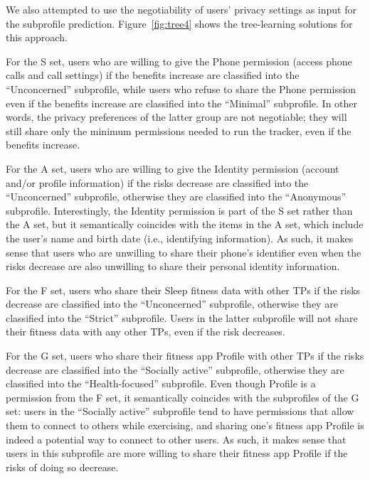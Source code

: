 We also attempted to use the negotiability of users' privacy settings as input for the subprofile prediction. Figure~\ref{fig:tree4} shows the tree-learning solutions for this approach.

%	


For the S set, users who are willing to give the Phone permission (access phone calls and call settings) if the benefits increase are classified into the ``Unconcerned'' subprofile, while users who refuse to share the Phone permission even if the benefits increase are classified into the ``Minimal'' subprofile. In other words, the privacy preferences of the latter group are not negotiable; they will still share only the minimum permissions needed to run the tracker, even if the benefits increase.

For the A set, users who are willing to give the Identity permission (account and/or profile information) if the risks decrease are classified into the ``Unconcerned'' subprofile, otherwise they are classified into the ``Anonymous'' subprofile. Interestingly, the Identity permission is part of the S set rather than the A set, but it semantically coincides with the items in the A set, which include the user's name and birth date (i.e., identifying information). As such, it makes sense that users who are unwilling to share their phone's identifier even when the risks decrease are also unwilling to share their personal identity information.

For the F set, users who share their Sleep fitness data with other TPs if the risks decrease are classified into the ``Unconcerned'' subprofile, otherwise they are classified into the ``Strict'' subprofile. Users in the latter subprofile will not share their fitness data with any other TPs, even if the risk decreases.

For the G set, users who share their fitness app Profile with other TPs if the risks decrease are classified into the ``Socially active'' subprofile, otherwise they are classified into the ``Health-focused'' subprofile. Even though Profile is a permission from the F set, it semantically coincides with the subprofiles of the G set: users in the ``Socially active'' subprofile tend to have permissions that allow them to connect to others while exercising, and sharing one's fitness app Profile is indeed a potential way to connect to other users. As such, it makes sense that users in this subprofile are more willing to share their fitness app Profile if the risks of doing so decrease.

